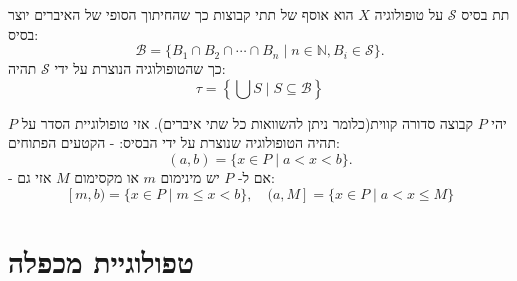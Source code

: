\documentclass{tstextbook}
\begin{document}
\begin{definition}[תת בסיס]
תת בסיס \(\mathcal{S}\) על טופולוגיה \(X\) הוא אוסף של תתי קבוצות כך שהחיתוך הסופי של האיברים יוצר בסיס:
$${\mathcal{B}}=\{B_{1}\cap B_{2}\cap\cdots\cap B_{n}\mid n\in\mathbb{N},B_{i}\in{\mathcal{S}}\}.$$
כך שהטופולוגיה הנוצרת על ידי \(\mathcal{S}\) תהיה:
$$\tau=\left\{\bigcup S\mid S\subseteq\mathcal{B}\right\}$$

\end{definition}
\begin{definition}
יהי \(P\) קבוצה סדורה קווית(כלומר ניתן להשוואות כל שתי איברים). אזי טופולוגיית הסדר על \(P\) תהיה הטופולוגיה שנוצרת על ידי הבסיס:
- הקטעים הפתוחים:
$$(a,b)=\{x\in P\mid a<x<b\}.$$
- אם ל- \(P\) יש מינימום \(m\) או מקסימום \(M\) אזי גם:
$$[m,b)=\{x\in P\mid m\leq x<b\},\quad(a,M]=\{x\in P\mid a<x\leq M\}$$

\end{definition}
\section{טפולוגיית מכפלה}
\end{document}

